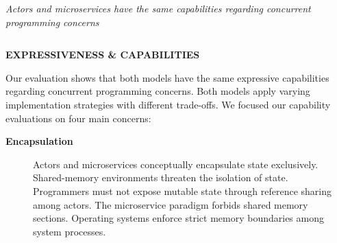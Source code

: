 \documentclass[final,hyperref={pdfpagelabels=true}]{beamer}
\newcommand{\sectionlinetwo}[2]{%
  \nointerlineskip 
  \vspace{.5\baselineskip}
  \hspace{\fill}
  {\color{#1}
    \resizebox{.2\linewidth}{2.5ex}
    {{%
    {\begin{tikzpicture}
    \node (C) at (0,0) {};
    \node (D) at (9,0) {};
    \path (C) to [ornament=#2] (D);
    \end{tikzpicture}}}}}%
    \hspace{\fill}
    \par\nointerlineskip \vspace{.5\baselineskip}
  }
\begin{document}
\begin{frame}
  \begin{columns}[t]
    \begin{column}{.04\textwidth}
    \end{column}
    \begin{column}{.92\textwidth}
      \begin{center}
        {\lmodern
          \Large
          \frqq\textsl{Actors and microservices have the same capabilities regarding concurrent programming concerns}\flqq
        }
      \end{center}
    \end{column}
    \begin{column}{.04\textwidth}
    \end{column}
  \end{columns}

  \vspace*{2.7\baselineskip}

  
  \begin{columns}[t]
    \begin{column}{.04\textwidth}
      \end{column}
    \begin{column}{.43\textwidth}
      \textsf{\textbf{EXPRESSIVENESS \& CAPABILITIES}} \\
      \vspace*{.5\baselineskip}
      {\lmodern
        \begin{justify}
        Our evaluation shows that both models have the same expressive capabilities regarding concurrent programming concerns. Both models apply varying implementation strategies with different trade-offs. We focused our capability evaluations on four main concerns:
        \end{justify}
        
        \vspace*{0.5\baselineskip}

        \renewcommand\sfdefault{lmss} %

        \begin{description}
          \item[\textbf{\textsf{Encapsulation}}] 
          \begin{justify}
          Actors and microservices conceptually encapsulate state exclusively. Shared-memory environments threaten the isolation of state. Programmers must not expose mutable state through reference sharing among actors. The microservice paradigm forbids shared memory sections. Operating systems enforce strict memory boundaries among system processes.
          \end{justify}


\end{description}}
\end{column}
\end{columns}
\end{frame}
\end{document}
